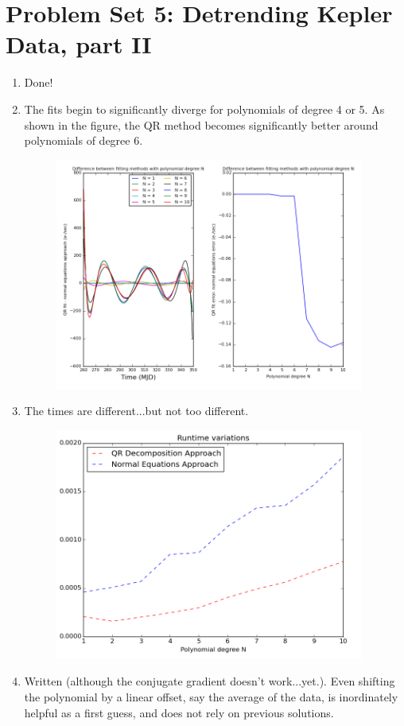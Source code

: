 \documentclass[10pt, preprint]{aastex}
\begin{document}
\section*{Problem Set 5: Detrending Kepler Data, part II}
\begin{enumerate}
\item Done!

\item The fits begin to significantly diverge for polynomials of degree 4 or 5. As shown in the figure, the QR method becomes significantly better around polynomials of degree 6.
\begin{figure}[!ht]
  \includegraphics[width=4in]{hw5_fig1.png}
\end{figure}

\item The times are different...but not too different.
\begin{figure}[!ht]
  \includegraphics[width=4in]{hw5_fig2.png}
\end{figure}

\item Written (although the conjugate gradient doesn't work...yet.). Even shifting the polynomial by a linear offset, say the average of the data, is inordinately helpful as a first guess, and does not rely on previous solutions.


\end{enumerate}
\end{document}
